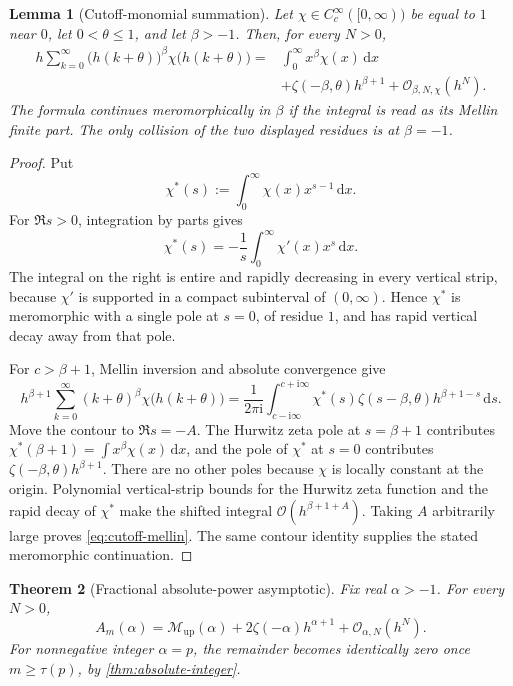 \documentclass[11pt]{article}
\newtheorem{theorem}{Theorem}[section]
\newtheorem{lemma}[theorem]{Lemma}
\theoremstyle{definition}
\newcommand{\Up}{\operatorname{up}}
\newcommand{\dd}{\,\mathrm{d}}
\newcommand{\ii}{\mathrm{i}}
\newcommand{\Mell}{\mathcal{M}}
\newcommand{\bigO}{\mathcal{O}}
\begin{document}
\begin{lemma}[Cutoff-monomial summation]
\label{lem:cutoff-mellin}
Let $\chi\in C_c^\infty([0,\infty))$ be equal to $1$ near $0$, let
$0<\theta\le1$, and let $\beta>-1$.  Then, for every $N>0$,
\begin{equation}
\begin{split}
 h\sum_{k=0}^{\infty}\bigl(h(k+\theta)\bigr)^\beta
 \chi\bigl(h(k+\theta)\bigr)
 ={}&\int_0^\infty x^\beta\chi(x)\dd x\\
 &+\zeta(-\beta,\theta)h^{\beta+1}+\bigO_{\beta,N,\chi}(h^N).
\end{split}
\label{eq:cutoff-mellin}
\end{equation}
The formula continues meromorphically in $\beta$ if the integral is read as
its Mellin finite part.  The only collision of the two displayed residues is
at $\beta=-1$.
\end{lemma}

\begin{proof}
Put
\[
 \chi^*(s):=\int_0^\infty \chi(x)x^{s-1}\dd x.
\]
For $\Re s>0$, integration by parts gives
\[
 \chi^*(s)=-\frac1s\int_0^\infty\chi'(x)x^s\dd x.
\]
The integral on the right is entire and rapidly decreasing in every vertical
strip, because $\chi'$ is supported in a compact subinterval of
$(0,\infty)$.  Hence $\chi^*$ is meromorphic with a single pole at $s=0$,
of residue $1$, and has rapid vertical decay away from that pole.

For $c>\beta+1$, Mellin inversion and absolute convergence give
\[
 h^{\beta+1}\sum_{k=0}^\infty(k+\theta)^\beta
 \chi\bigl(h(k+\theta)\bigr)
 =\frac1{2\pi\ii}\int_{c-\ii\infty}^{c+\ii\infty}
 \chi^*(s)\zeta(s-\beta,\theta)h^{\beta+1-s}\dd s.
\]
Move the contour to $\Re s=-A$.  The Hurwitz zeta pole at $s=\beta+1$
contributes $\chi^*(\beta+1)=\int x^\beta\chi(x)\dd x$, and the pole of
$\chi^*$ at $s=0$ contributes
$\zeta(-\beta,\theta)h^{\beta+1}$.  There are no other poles because $\chi$
is locally constant at the origin.  Polynomial vertical-strip bounds for the
Hurwitz zeta function and the rapid decay of $\chi^*$ make the shifted
integral $\bigO(h^{\beta+1+A})$.  Taking $A$ arbitrarily large proves
\eqref{eq:cutoff-mellin}.  The same contour identity supplies the stated
meromorphic continuation.
\end{proof}

\begin{theorem}[Fractional absolute-power asymptotic]
\label{thm:fractional-zeta}
Fix real $\alpha>-1$.  For every $N>0$,
\begin{equation}
 \boxed{
 A_m(\alpha)
 =\Mell_{\Up}(\alpha)
 +2\zeta(-\alpha)h^{\alpha+1}
 +\bigO_{\alpha,N}(h^N).}
 \label{eq:fractional-zeta}
\end{equation}
For nonnegative integer $\alpha=p$, the remainder becomes identically zero
once $m\ge\tau(p)$, by \cref{thm:absolute-integer}.
\end{theorem}
\end{document}
